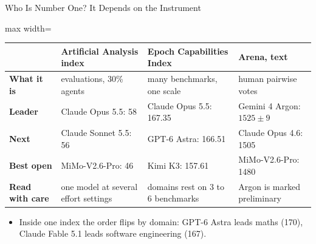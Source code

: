 \begin{frame}{Who Is Number One? It Depends on the Instrument}
    \begin{center}
    \small
    \renewcommand{\arraystretch}{1.08}
    \begin{adjustbox}{max width=\linewidth}\begin{tabular}{>{\raggedright\arraybackslash}p{2.2cm}>{\raggedright\arraybackslash}p{3.3cm}>{\raggedright\arraybackslash}p{3.3cm}>{\raggedright\arraybackslash}p{3.3cm}}
        \toprule
        & \textbf{Artificial Analysis index} & \textbf{Epoch Capabilities Index} & \textbf{Arena, text} \\
        \midrule
        \textbf{What it is} & 10 evaluations, 30\% agents & many benchmarks, one scale & human pairwise votes \\
        \textbf{Leader} & Claude Opus 5.5: 58 & Claude Opus 5.5: 167.35 & Gemini 4 Argon: $1525\pm9$ \\
        \textbf{Next} & Claude Sonnet 5.5: 56 & GPT-6 Astra: 166.51 & Claude Opus 4.6: 1505 \\
        \textbf{Best open} & MiMo-V2.6-Pro: 46 & Kimi K3: 157.61 & MiMo-V2.6-Pro: 1480 \\
        \textbf{Read with care} & one model at several effort settings & domains rest on 3 to 6 benchmarks & Argon is marked preliminary \\
        \bottomrule
    \end{tabular}\end{adjustbox}
    \end{center}
    \begin{itemize}\itemsep0.35em
        \item Inside one index the order flips by domain: GPT-6 Astra leads maths (170), Claude Fable 5.1 leads software engineering (167).

    \end{itemize}
\end{frame}

